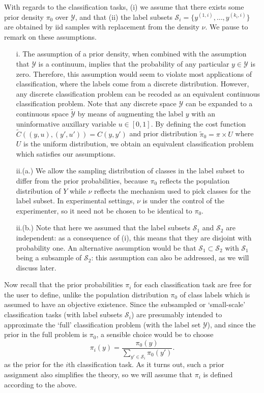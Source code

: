 \documentclass[12pt]{article}
\begin{document}
With regards to the classification tasks, (i) we assume that there
exists some prior density $\pi_0$ over $\mathcal{Y}$, and that (ii)
the label subsets $\mathcal{S}_i = \{y^{(1,i)}, \hdots, y^{(k_i,i)}\}$
are obtained by iid samples with replacement from the density $\nu$.
We pause to remark on these assumptions.
\begin{itemize}
\item[i.]
The assumption of a prior density, when combined with the assumption
that $\mathcal{Y}$ is a continuum, implies that the probability of any
particular $y \in \mathcal{Y}$ is zero.  Therefore, this assumption
would seem to violate most applications of classification, where the
labels come from a discrete distribution.  However, any discrete
classification problem can be recoded as an equivalent continuous
classification problem.  Note that any discrete space $\mathcal{Y}$
can be expanded to a continuous space $\tilde{\mathcal{Y}}$ by means
of augmenting the label $y$ with an uninformative auxillary variable
$u \in [0,1]$.  By defining the cost function $\tilde{C}((y, u), (y',
u')) = C(y, y')$ and prior distribution $\tilde{\pi}_0 = \pi \times U$
where $U$ is the uniform distribution, we obtain an equivalent
classification problem which satisfies our assumptions.
\item[ii.(a.)]
We allow the sampling distribution of classes in the label subset to
differ from the prior probabilities, because $\pi_0$ reflects the
population distribution of $Y$ while $\nu$ reflects the mechanism
used to pick classes for the label subset.  In experimental settings,
$\nu$ is under the control of the experimenter, so it need not be
chosen to be identical to $\pi_0$.
\item[ii.(b.)]
Note that here we assumed that the label subsets $\mathcal{S}_1$ and
$\mathcal{S}_2$ are independent: as a consequence of (i), this means
that they are disjoint with probability one.  An alternative
assumption would be that $\mathcal{S}_1 \subset
\mathcal{S}_2$ with $\mathcal{S}_1$ being a subsample of
$\mathcal{S}_2$: this assumption can also be addressed, as we will
discuss later.
\end{itemize}

Now recall that the prior probabilities $\pi_i$ for each
classification task are free for the user to define, unlike the
population distribution $\pi_0$ of class labels which is assumed to
have an objective existence.  Since the subsampled or `small-scale'
classification tasks (with label subsets $\mathcal{S}_i$) are
presumably intended to approximate the `full' classification problem
(with the label set $\mathcal{Y}$), and since the prior in the full
problem is $\pi_0$, a sensible choice would be to choose
\[
\pi_i(y) = \frac{\pi_0(y)}{\sum_{y' \in \mathcal{S}_i} \pi_0(y')}.
\]
as the prior for the $i$th classification task.  As it turns out, such
a prior assignment also simplifies the theory, so we will assume that
$\pi_i$ is defined according to the above.
\end{document}
